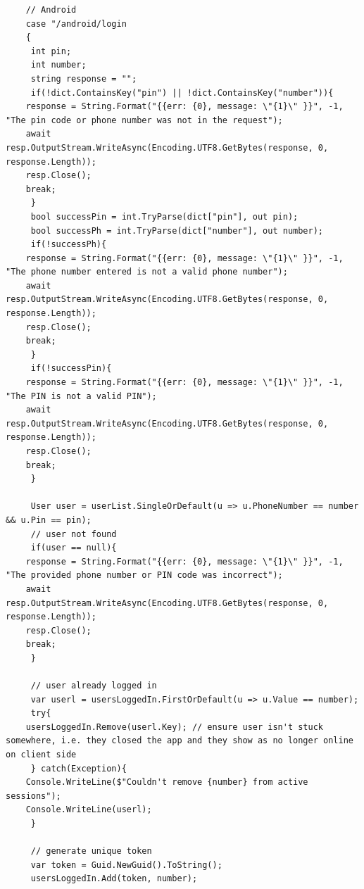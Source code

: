 \documentclass[11pt, a4paper]{article}
\begin{document}
\begin{appendices}
\begin{lstlisting}
    // Android
    case "/android/login
    {
     int pin;
     int number;
     string response = "";
     if(!dict.ContainsKey("pin") || !dict.ContainsKey("number")){
    response = String.Format("{{err: {0}, message: \"{1}\" }}", -1, "The pin code or phone number was not in the request");
    await resp.OutputStream.WriteAsync(Encoding.UTF8.GetBytes(response, 0, response.Length));
    resp.Close();
    break;
     }
     bool successPin = int.TryParse(dict["pin"], out pin);
     bool successPh = int.TryParse(dict["number"], out number);
     if(!successPh){
    response = String.Format("{{err: {0}, message: \"{1}\" }}", -1, "The phone number entered is not a valid phone number");
    await resp.OutputStream.WriteAsync(Encoding.UTF8.GetBytes(response, 0, response.Length));
    resp.Close();
    break;
     }
     if(!successPin){
    response = String.Format("{{err: {0}, message: \"{1}\" }}", -1, "The PIN is not a valid PIN");
    await resp.OutputStream.WriteAsync(Encoding.UTF8.GetBytes(response, 0, response.Length));
    resp.Close();
    break;
     }

     User user = userList.SingleOrDefault(u => u.PhoneNumber == number && u.Pin == pin);
     // user not found
     if(user == null){
    response = String.Format("{{err: {0}, message: \"{1}\" }}", -1, "The provided phone number or PIN code was incorrect");
    await resp.OutputStream.WriteAsync(Encoding.UTF8.GetBytes(response, 0, response.Length));
    resp.Close();
    break;
     }

     // user already logged in
     var userl = usersLoggedIn.FirstOrDefault(u => u.Value == number);
     try{
    usersLoggedIn.Remove(userl.Key); // ensure user isn't stuck somewhere, i.e. they closed the app and they show as no longer online on client side
     } catch(Exception){
    Console.WriteLine($"Couldn't remove {number} from active sessions");
    Console.WriteLine(userl);
     }

     // generate unique token
     var token = Guid.NewGuid().ToString();
     usersLoggedIn.Add(token, number);


\end{lstlisting}
\end{appendices}
\end{document}

